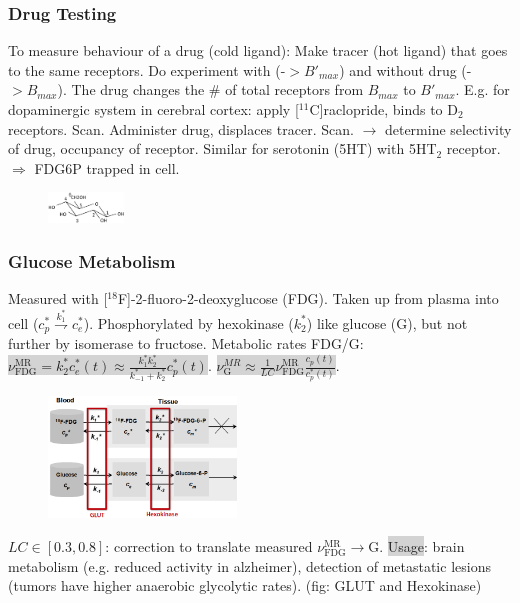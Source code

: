 \documentclass[9pt]{article}
\newcommand{\grey}[1]{\setlength{\fboxsep}{0pt}\colorbox{lightgrey}{#1}}
\begin{document}
\begin{multicols}{2}
\subsubsection{Drug Testing} To measure behaviour of a drug (cold ligand): Make tracer (hot ligand) that goes to the same receptors. Do experiment with (-$>B'_{max}$) and without drug (-$>B_{max}$). The drug changes the \# of total receptors from $B_{max}$ to $B'_{max}$. E.g. for dopaminergic system in cerebral cortex: apply [${}^{11}$C]raclopride, binds to D${}_2$ receptors. Scan. Administer drug, displaces tracer. Scan. $\rightarrow$ determine selectivity of drug, occupancy of receptor. Similar for serotonin (5HT) with 5HT${}_2$ receptor. $\Rightarrow$ FDG6P trapped in cell. 

\begin{figure}
	\vspace{-4mm}
	\includegraphics[width=2cm,]{glucose.PNG}
\end{figure}
\subsubsection{Glucose Metabolism} Measured with [${}^{18}$F]-2-fluoro-2-deoxyglucose (FDG). Taken up from plasma into cell ($c_p^* \overset{k_1^*}{\rightharpoondown} c_e^*$). Phosphorylated by hexokinase ($k_2^*$) like glucose (G), but not further by isomerase to fructose. 
Metabolic rates FDG/G: \grey{$\nu_\mathrm{FDG}^\mathrm{MR} = k_2^*c_e^*(t) \approx \frac{k_1^*k_2^*}{k_{-1}^*+k_2^*}c_p^*(t)$}.
\grey{$\nu_\mathrm{G}^{MR} \approx \frac{1}{LC} \nu_\mathrm{FDG}^\mathrm{MR} \frac{c_p(t)}{c_p^*(t)}$}.

\begin{figure}
	\vspace{-4mm}
	\includegraphics[width=5cm,]{FDG-Metabolism.png}
\end{figure}
\vspace{-1mm}

$LC\in[0.3,0.8]$: correction to translate measured $\nu_\mathrm{FDG}^\mathrm{MR}\rightarrow$G. \grey{Usage}: brain metabolism (e.g. reduced activity in alzheimer), detection of metastatic lesions (tumors have higher anaerobic glycolytic rates). (fig: GLUT and Hexokinase)


\end{multicols}
\end{document}
